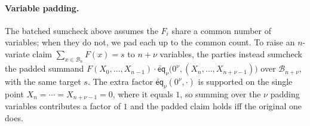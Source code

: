 \documentclass{article}
\theoremstyle{definition}
\newcommand*{\mle}{\widetilde}
\newcommand{\eq}{\mathsf{eq}}
\newcommand{\BB}{\mathcal{B}}
\begin{document}
\paragraph{Variable padding.}
\label{sec:variable-padding}
The batched sumcheck above assumes the $F_i$ share a common number of variables; when they do not, we pad each up to the common count. To raise an $n$-variate claim $\sum_{x \in \BB_n} F(x) = s$ to $n + \nu$ variables, the parties instead sumcheck the padded summand $F(X_0, \ldots, X_{n - 1}) \cdot \mle{\eq}_\nu\bigl( 0^\nu, (X_n, \ldots, X_{n + \nu - 1}) \bigr)$ over $\BB_{n + \nu}$, with the same target $s$. The extra factor $\mle{\eq}_\nu(0^\nu, \cdot)$ is supported on the single point $X_n = \cdots = X_{n + \nu - 1} = 0$, where it equals $1$, so summing over the $\nu$ padding variables contributes a factor of $1$ and the padded claim holds iff the original one does.
\end{document}
